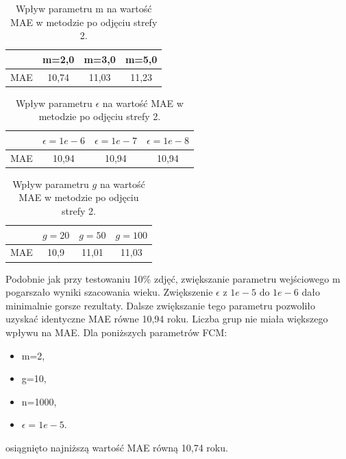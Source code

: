 \documentclass[a4paper,twoside,12pt]{book}
\begin{document}
    \begin{table}[]
        \centering
        \caption{Wpływ parametru m na wartość MAE w metodzie po odjęciu strefy 2.}
        \begin{tabular}{|c|c|c|c|}
            \hline
            & m=2,0 & m=3,0 & m=5,0 \\ \hline
            MAE & 10,74 & 11,03 & 11,23 \\ \hline
        \end{tabular}
        \label{tab.odjeta_m_cv}
    \end{table}
    \begin{table}[]
        \centering
        \caption{Wpływ parametru $\epsilon$ na wartość MAE w metodzie po odjęciu strefy 2.}
        \begin{tabular}{|c|c|c|c|}
            \hline
            & $\epsilon=1e-6$ & $\epsilon=1e-7$ & $\epsilon=1e-8$ \\ \hline
            MAE & 10,94 & 10,94 & 10,94 \\ \hline
        \end{tabular}
        \label{tab.odjeta_e_cv}
    \end{table}
    \begin{table}[]
        \centering
        \caption{Wpływ parametru $g$ na wartość MAE w metodzie po odjęciu strefy 2.}
        \begin{tabular}{|c|c|c|c|}
            \hline
            & $g=20$ & $g=50$ & $g=100$ \\ \hline
            MAE & 10,9 & 11,01 & 11,03 \\ \hline
        \end{tabular}
        \label{tab.odjeta_g_cv}
    \end{table}

    Podobnie jak przy testowaniu 10\% zdjęć, zwiększanie parametru wejściowego m pogarszało wyniki szacowania wieku.
    Zwiększenie $\epsilon$ z $1e-5$ do $1e-6$ dało minimalnie gorsze rezultaty. Dalsze zwiększanie tego parametru
    pozwoliło uzyskać identyczne MAE równe 10,94 roku.
    Liczba grup nie miała większego wpływu na MAE.
    Dla poniższych parametrów FCM:
    \begin{itemize}
        \item m=2,
        \item g=10,
        \item n=1000,
        \item $\epsilon=1e-5$.
    \end{itemize}
    osiągnięto najniższą wartość MAE równą 10,74 roku.
\end{document}
